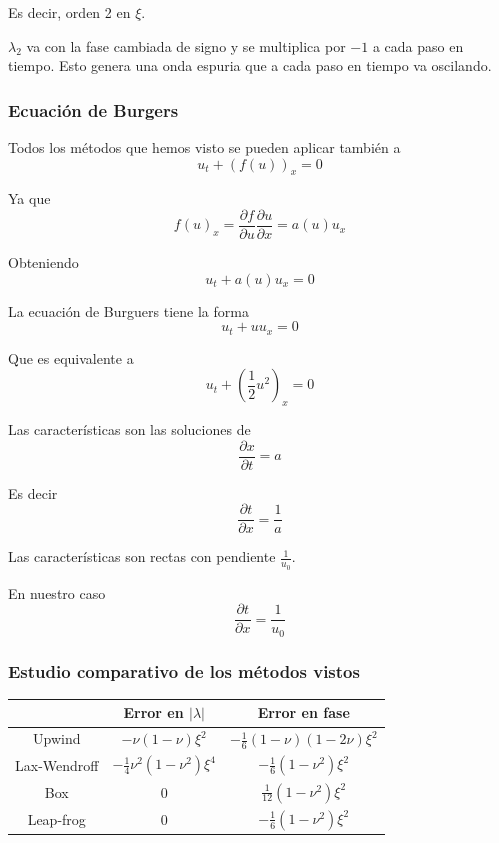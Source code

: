 Es decir, orden 2 en $\xi$.

$\lambda_2$ va con la fase cambiada de signo y se multiplica por $-1$ a cada paso en tiempo. Esto genera una onda espuria que a cada paso en tiempo va oscilando.

\subsubsection{Ecuación de Burgers}
Todos los métodos que hemos visto se pueden aplicar también a 
$$u_t+(f(u))_x = 0$$

Ya que
$$f(u)_x = \frac{\partial f}{\partial u}\frac{\partial u}{\partial x} = a(u) u_x$$

Obteniendo
$$u_t+a(u)u_x = 0$$

La ecuación de Burguers tiene la forma
$$u_t+uu_x = 0$$

Que es equivalente a
$$u_t+(\frac{1}{2}u^2)_x = 0$$

Las características son las soluciones de
$$\frac{\partial x}{\partial t} = a$$

Es decir
$$\frac{\partial t}{\partial x} = \frac{1}{a}$$

Las características son rectas con pendiente $\frac{1}{u_0}$.

En nuestro caso
$$\frac{\partial t}{\partial x} = \frac{1}{u_0}$$

\subsubsection{Estudio comparativo de los métodos vistos}

\begin{center}
\begin{tabular}{c|c|c|}
	\cline{2-3}
	& Error en $|\lambda|$              & Error en fase                      \\ \hline
	\multicolumn{1}{|c|}{Upwind}       & $-\nu(1-\nu)\xi^2$                & $-\frac{1}{6}(1-\nu)(1-2\nu)\xi^2$ \\ \hline
	\multicolumn{1}{|c|}{Lax-Wendroff} & $-\frac{1}{4}\nu^2(1-\nu^2)\xi^4$ & $-\frac{1}{6}(1-\nu^2)\xi^2$       \\ \hline
	\multicolumn{1}{|c|}{Box}          & 0                                 & $\frac{1}{12}(1-\nu^2)\xi^2$       \\ \hline
	\multicolumn{1}{|c|}{Leap-frog}    & 0                                 & $-\frac{1}{6}(1-\nu^2)\xi^2$       \\ \hline
\end{tabular}
\end{center}